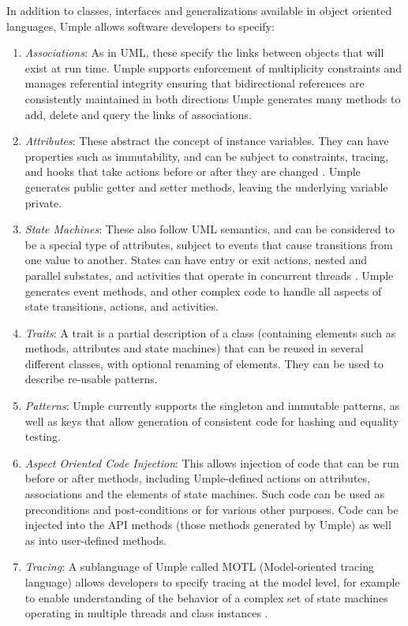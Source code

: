 In addition to classes, interfaces and generalizations available in object oriented languages, Umple allows software developers to specify:
\begin{enumerate}

 \item 	\textit{Associations}: As in UML, these specify the links between objects that will exist at run time. Umple supports enforcement of multiplicity constraints and manages referential integrity \- ensuring that bidirectional references are consistently maintained in both directions \cite{UmpleAssociations} Umple generates many methods to add, delete and query the links of associations.

 \item 	\textit{Attributes}: These abstract the concept of instance variables. They can have properties such as immutability, and can be subject to constraints, tracing, and hooks that take actions before or after they are changed \cite{UmpleAttributes}. Umple generates public getter and setter methods, leaving the underlying variable private.
 
 \item \textit{State Machines}: These also follow UML semantics, and can be considered to be a special type of attributes, subject to events that cause transitions from one value to another. States can have entry or exit actions, nested and parallel substates, and activities that operate in concurrent threads \cite{Badreddin2012_Thesis}. Umple generates event methods, and other complex code to handle all aspects of state transitions, actions, and activities.
 
 \item 	\textit{Traits}: A trait is a partial description of a class (containing elements such as methods, attributes and state machines) that can be reused in several different classes, with optional renaming of elements. They can be used to describe re-usable patterns.

 \item 	\textit{Patterns}: Umple currently supports the singleton and immutable patterns, as well as keys that allow generation of consistent code for hashing and equality testing.

 \item 	\textit{Aspect Oriented Code Injection}: This allows injection of code that can be run before or after methods, including Umple-defined actions on attributes, associations and the elements of state machines. Such code can be used as preconditions and post-conditions or for various other purposes. Code can be injected into the API methods (those methods generated by Umple) as well as into user-defined methods. 
 \item 	\textit{Tracing}:  A sublanguage of Umple called MOTL (Model-oriented tracing language) allows developers to specify tracing at the model level, for example to enable understanding of the behavior of a complex set of state machines operating in multiple threads and class instances \cite{UmpleTracing}.


\end{enumerate}
